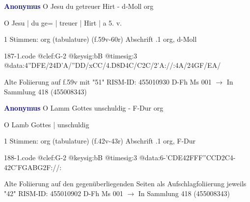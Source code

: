 \documentclass[twocolumn]{book}
\begin{document}
\newline \par \vspace{7pt} \textcolor{darkblue}{\textbf{Anonymus  }}
\newline O Jesu du getreuer Hirt - d-Moll
\newline org
\newline \begin{itshape}[f.59v, at left:] O Jesu | du ge= | treuer | Hirt | a 5. v.\end{itshape} 
\newline \textcolor{darkblue}{}  1 Stimmen: org (tabulature)  (f.59v-60r)
\newline Abschrift
.1  org, d-Moll  
\begin{filecontents*}{187-1.code}
@clef:G-2
@keysig:bB
@timesig:3
@data:4''DFE/24D'A/''DD/xCC/4.D8D4C/C2C/2'A://:4A/24GF/EA/
\end{filecontents*}
\newline
%
\newline Alte Foliierung auf f.59v mit "51"
\newline RISM-ID: 455010930
\newline D-Fh  Ms 001
\newline $\rightarrow$ In Sammlung 418 (455008343)
      
\newline \par \vspace{7pt} \textcolor{darkblue}{\textbf{Anonymus  }}
\newline O Lamm Gottes unschuldig - F-Dur
\newline org
\newline \begin{itshape}[f.42v, at left:] O Lamb Gottes | unschuldig\end{itshape} 
\newline \textcolor{darkblue}{}  1 Stimmen: org (tabulature)  (f.42v-43r)
\newline Abschrift
.1  org, F-Dur  
\begin{filecontents*}{188-1.code}
@clef:G-2
@keysig:bB
@timesig:3
@data:6-{'CDE}42FFF''CCD2C4-42C'FGABG2F://:
\end{filecontents*}
\newline
%
\newline Alte Foliierung auf den gegenüberliegenden Seiten als Aufschlagfoliierung jeweils "42"
\newline RISM-ID: 455010902
\newline D-Fh  Ms 001
\newline $\rightarrow$ In Sammlung 418 (455008343)
      
\end{document}
